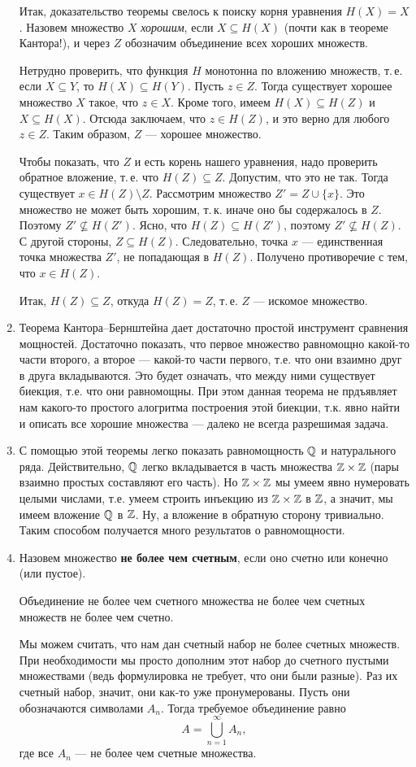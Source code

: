\begin{enumerate}
Итак, доказательство теоремы свелось к поиску корня уравнения $H(X)=X$. Назовем
множество $X$ {\itshape хорошим}, если $X\subseteq H(X)$ (почти как в теореме Кантора!), и через $Z$ обозначим
объединение всех хороших множеств.

Нетрудно проверить, что функция $H$ монотонна по вложению множеств, т.\,е.
если $X\subseteq Y$, то $H(X)\subseteq H(Y)$. Пусть $z\in Z$. Тогда существует
хорошее множество $X$ такое, что $z\in X$. Кроме того, имеем $H(X)\subseteq
H(Z)$ и $X\subseteq H(X)$. Отсюда заключаем, что $z\in H(Z)$, и это верно
для любого $z\in Z$. Таким образом, $Z$ --- хорошее множество.

Чтобы показать, что $Z$ и есть корень нашего уравнения, надо проверить обратное
вложение, т.\,е. что $H(Z)\subseteq Z$. Допустим, что это не так. Тогда
существует $x\in H(Z)\setminus Z$. Рассмотрим множество $Z'=Z\cup\{x\}$.
Это множество не может быть хорошим, т.\,к. иначе оно бы содержалось в $Z$.
Поэтому $Z'\not\subseteq H(Z')$. Ясно, что $H(Z)\subseteq H(Z')$, поэтому
$Z'\not\subseteq H(Z)$. С другой стороны, $Z\subseteq H(Z)$. Следовательно,
точка $x$ --- единственная точка множества $Z'$, не попадающая в $H(Z)$.
Получено противоречие с тем, что $x\in H(Z)$.

Итак, $H(Z)\subseteq Z$, откуда $H(Z)=Z$, т.\,е. $Z$ --- искомое множество.\epf

\item Теорема Кантора--Бернштейна дает достаточно простой инструмент сравнения мощностей. Достаточно показать, что первое множество равномощно какой-то части второго, а второе --- какой-то части первого, т.е. что они взаимно друг в друга вкладываются. Это будет означать, что между ними существует биекция, т.е. что они равномощны. При этом данная теорема не прдъявляет нам какого-то простого алогритма построения этой биекции, т.к. явно найти и описать все хорошие множества --- далеко не всегда разрешимая задача.
\item С помощью этой теоремы легко показать равномощность $\mathbb Q$ и натурального ряда. Действительно, $\mathbb Q$ легко вкладывается в часть множества $\mathbb Z\times \mathbb Z$ (пары взаимно простых составляют его часть). Но $\mathbb Z\times\mathbb Z$ мы умеем явно нумеровать целыми числами, т.е. умеем строить инъекцию из $\mathbb Z\times\mathbb Z$ в $\mathbb Z$, а значит, мы имеем вложение $\mathbb Q$ в $\mathbb Z$. Ну, а вложение в обратную сторону тривиально. Таким способом получается много результатов о равномощности.
\item Назовем множество \textbf{не более чем счетным}, если оно счетно или конечно (или пустое).
\begin{thrm}
Объединение не более чем счетного множества не более чем счетных множеств не более чем счетно.
\end{thrm}
\pf Мы можем считать, что нам дан счетный набор не более счетных множеств. При необходимости мы просто дополним этот набор до счетного пустыми множествами (ведь формулировка не требует, что они были разные). Раз их счетный набор, значит, они как-то уже пронумерованы. Пусть они обозначаются символами $A_n$. Тогда требуемое объединение равно
$$
A = \bigcup_{n=1}^\infty A_n,
$$
где все $A_n$ --- не более чем счетные множества.


\end{enumerate}

